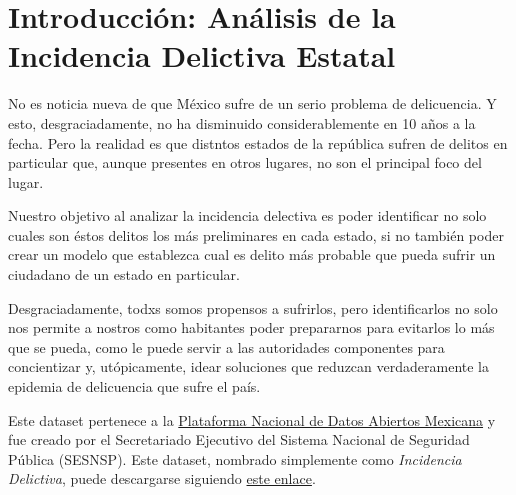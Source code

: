 \section{Introducción: Análisis de la Incidencia Delictiva Estatal}

No es noticia nueva de que México sufre de un serio problema de delicuencia. Y esto, desgraciadamente,
no ha disminuido considerablemente en 10 años a la fecha. Pero la realidad es que distntos estados
de la república sufren de delitos en particular que, aunque presentes en otros lugares, no son el
principal foco del lugar.

Nuestro objetivo al analizar la incidencia delectiva es poder identificar no solo cuales son éstos
delitos los más preliminares en cada estado, si no también poder crear un modelo que establezca cual
es delito más probable que pueda sufrir un ciudadano de un estado en particular.

Desgraciadamente, todxs somos propensos a sufrirlos, pero identificarlos no solo nos permite a nostros
como habitantes poder prepararnos para evitarlos lo más que se pueda, como le puede servir a las autoridades
componentes para concientizar y, utópicamente, idear soluciones que reduzcan verdaderamente la epidemia
de delicuencia que sufre el país.

Este dataset pertenece a la \href{https://www.datos.gob.mx/}{Plataforma Nacional de Datos Abiertos Mexicana} y fue
creado por el Secretariado Ejecutivo del Sistema Nacional de Seguridad Pública (SESNSP). Este dataset, nombrado
simplemente como \textit{Incidencia Delictiva}, puede descargarse siguiendo \href{https://www.datos.gob.mx/dataset/incidencia_delictiva/resource/d9b2792a-33a2-4ea8-8527-210d9e99de5e}{este enlace}.

